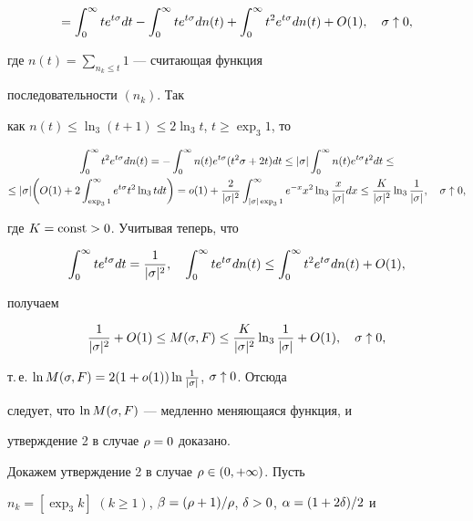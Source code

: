 \begin{pf}
\begin{multline*}
=\int_0^\i te^{t\s}dt-\int_0^\i te^{t\s}dn(t)+\int_0^\i


t^2e^{t\s}dn(t)+ O(1),\quad \s\uparrow 0,


\end{multline*}


где $n(t)=\sum\limits_{n_k\le t}1$ --- считающая функция


последовательности $(n_k)$. Так 


как $n(t)\le \ln_3(t+1)\le2\ln_3t$, $t\ge \exp_3 1$, то 


\begin{multline*}


\int_0^\i t^2e^{t\s}dn(t)=-\int_0^\i n(t)e^{t\s}(t^2\s+2t)dt\le


|\s|\int_0^\i n(t)e^{t\s}t^2dt\le\\


\le |\s|\biggl(O(1)+2\int_{\exp_3 1}^\i


e^{t\s}t^2\ln_3tdt\biggr)=


o(1)+\frac2{|\s|^2}\int_{|\s|\exp_3 1}^\i


e^{-x}x^2\ln_3\frac{x}{|\s|}dx\le


\frac{K}{|\s|^2}\ln_3\frac1{|\s|}, \quad \s\uparrow 0,


\end{multline*}


где $K=\operatorname{const}>0$. Учитывая теперь, что


$$


\int_0^\i te^{t\s}dt=\frac1{|\s|^2},\quad\int_0^\i te^{t\s}dn(t)\le\int_0^\i


t^2e^{t\s}dn(t)+O(1),


$$


получаем


$$


\frac1{|\s|^2}+O(1)\le M(\s,F)\le\frac{K}{|\s|^2}\ln_3\frac1{|\s|}+O(1),


\quad\s\uparrow 0,


$$


т.\,е. $\ln M(\sigma,F)=2(1+o(1))\ln\frac{1}{|\sigma|}$, $\sigma\uparrow 0$. Отсюда


следует, что $\ln M(\sigma,F)$ --- медленно меняющаяся функция, и


утверждение 2 в случае $\rho=0$ доказано.





Докажем утверждение 2 в случае $\rho\in(0,+\infty)$. Пусть


$n_k=[\exp_3 k]$ $(k\ge 1)$, $\beta=(\rho+1)/\rho$, $\delta>0$, $\alpha=(1+2\delta)/2$ и 



\end{pf}
